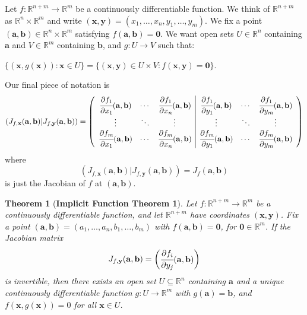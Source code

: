\documentclass[12pt]{article}
\newcommand{\real}{\mathbb{R}}
\newcommand\set[1]{\{#1\}}
\newtheorem{thm}{Theorem}[section]
\begin{document}
\begin{indent}
  Let $f: \real^{n+m} \to \real^m$ be a continuously differentiable function. We think of $\real^{n+m}$ as $\real^n \times \real^m$ and write $(\mathbf{x},\mathbf{y}) = (x_1, \dots, x_n, y_1, \dots, y_m)$. We fix a point
  $(\mathbf{a}, \mathbf{b}) \in \real^n \times \real^m$ satisfying $f(\mathbf{a},\mathbf{b})=\mathbf{0}$. We want open sets $U \in \real^n$ containing $\mathbf{a}$ and $V \in \real^m$ containing $\mathbf{b}$, and $g: U \to V$ such that:
  \begin{center}
    $\set{(\mathbf{x}, g(\mathbf{x})) : \mathbf{x} \in U} = \set{(\mathbf{x}, \mathbf{y}) \in U \times V :  f(\mathbf{x}, \mathbf{y}) = \mathbf{0}}$.
  \end{center}
  Our final piece of notation is
  \begin{equation*}
    (J_{f,\mathbf{x}}(\mathbf{a}, \mathbf{b}) \vert J_{f,\mathbf{y}}(\mathbf{a},\mathbf{b}))= 
    \begingroup
    \left(
    \begin{array}{ccc|ccc}
      \cfrac{\partial f_1}{\partial x_1}(\mathbf{a},\mathbf{b}) & \cdots & \cfrac{\partial f_1}{\partial x_n}(\mathbf{a},\mathbf{b}) & \cfrac{\partial f_1}{\partial y_1}(\mathbf{a},\mathbf{b}) & \cdots & \cfrac{\partial f_1}{\partial y_m}(\mathbf{a},\mathbf{b}) \\
      \vdots & \ddots & \vdots                                     & \vdots & \ddots & \vdots\\
      \cfrac{\partial f_m}{\partial x_1}(\mathbf{a},\mathbf{b}) & \cdots & \cfrac{\partial f_m}{\partial x_n}(\mathbf{a},\mathbf{b}) &  \cfrac{\partial f_m}{\partial y_1}(\mathbf{a},\mathbf{b}) & \cdots & \cfrac{\partial f_m}{\partial y_m}(\mathbf{a},\mathbf{b})
    \end{array}
    \right)
    \endgroup
  \end{equation*}
  where
  \begin{equation*}
        (J_{f,\mathbf{x}}(\mathbf{a}, \mathbf{b}) \vert J_{f,\mathbf{y}}(\mathbf{a},\mathbf{b}))= J_f(\mathbf{a}, \mathbf{b})
  \end{equation*}
  is just the Jacobian of $f$ at $(\mathbf{a}, \mathbf{b})$.
\end{indent}
\begin{thm}[\textbf{Implicit Function Theorem 1}]
  Let $f : \real^{n+m} \to \real^m$ be a continuously differentiable function, and let  $\real^{n+m}$ have coordinates $(\mathbf{x}, \mathbf{y})$. Fix a point $(\mathbf{a},\mathbf{b})=(a_1,\dots,a_n,b_1,\dots,b_m)$ with
  $f(\mathbf{a},\mathbf{b}) = \mathbf{0}$, for $\mathbf{0} \in \real^m$. If the Jacobian matrix
  \begin{equation*}
    J_{f,\mathbf{y}}(\mathbf{a},\mathbf{b}) =
    \begin{pmatrix}
      \cfrac{\partial f_i}{\partial y_j}(\mathbf{a}, \mathbf{b})
    \end{pmatrix}
  \end{equation*}
  is invertible, then there exists an open set $U \subseteq \real^n$ containing $\textbf{a}$ and a unique continuously differentiable function $g: U \to \real^m$ with $g(\mathbf{a}) = \mathbf{b}$, and  $f(\mathbf{x},g(\mathbf{x})) = 0$ for all $\mathbf{x} \in U$.
\end{thm}
\end{document}
